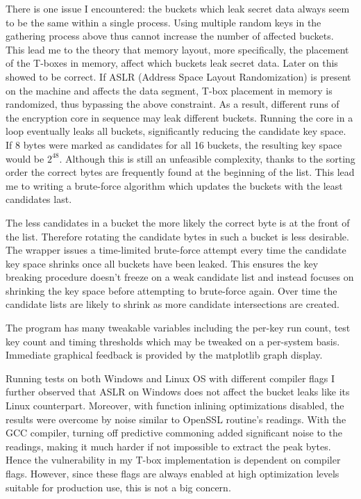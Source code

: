 \documentclass{article}
\begin{document}
There is one issue I encountered: the buckets which leak secret data always seem to be the same within a single process.
Using multiple random keys in the gathering process above thus cannot increase the number of affected buckets.
This lead me to the theory that memory layout, more specifically, the placement of the T-boxes in memory, affect which buckets leak secret data. Later on this showed to be correct.
\clearpage
If ASLR (Address Space Layout Randomization) is present on the machine and affects the data segment, T-box placement in memory is randomized, thus bypassing the above constraint.
As a result, different runs of the encryption core in sequence may leak different buckets.
Running the core in a loop eventually leaks all buckets, significantly reducing the candidate key space. If 8 bytes were marked as candidates for all 16 buckets, the resulting key space would be $2^{48}$.
Although this is still an unfeasible complexity, thanks to the sorting order the correct bytes are frequently found at the beginning of the list.
This lead me to writing a brute-force algorithm which updates the buckets with the least candidates last.

The less candidates in a bucket the more likely the correct byte is at the front of the list.
Therefore rotating the candidate bytes in such a bucket is less desirable.
The wrapper issues a time-limited brute-force attempt every time the candidate key space shrinks once all buckets have been leaked.
This ensures the key breaking procedure doesn't freeze on a weak candidate list and instead focuses on shrinking the key space before attempting to brute-force again.
Over time the candidate lists are likely to shrink as more candidate intersections are created.

The program has many tweakable variables including the per-key run count, test key count and timing thresholds which may be tweaked on a per-system basis.
Immediate graphical feedback is provided by the matplotlib graph display.

Running tests on both Windows and Linux OS with different compiler flags I further observed that ASLR on Windows does not affect the bucket leaks like its Linux counterpart.
Moreover, with function inlining optimizations disabled, the results were overcome by noise similar to OpenSSL routine's readings.
With the GCC compiler, turning off predictive commoning added significant noise to the readings, making it much harder if not impossible to extract the peak bytes.
Hence the vulnerability in my T-box implementation is dependent on compiler flags.
However, since these flags are always enabled at high optimization levels suitable for production use, this is not a big concern.
\end{document}
